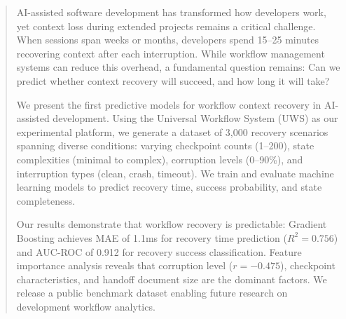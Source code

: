 \begin{abstract}
AI-assisted software development has transformed how developers work, yet context loss during extended projects remains a critical challenge. When sessions span weeks or months, developers spend 15--25 minutes recovering context after each interruption. While workflow management systems can reduce this overhead, a fundamental question remains: Can we predict whether context recovery will succeed, and how long it will take?

We present the first predictive models for workflow context recovery in AI-assisted development. Using the Universal Workflow System (UWS) as our experimental platform, we generate a dataset of 3,000 recovery scenarios spanning diverse conditions: varying checkpoint counts (1--200), state complexities (minimal to complex), corruption levels (0--90\%), and interruption types (clean, crash, timeout). We train and evaluate machine learning models to predict recovery time, success probability, and state completeness.

Our results demonstrate that workflow recovery is predictable: Gradient Boosting achieves MAE of 1.1ms for recovery time prediction ($R^2 = 0.756$) and AUC-ROC of 0.912 for recovery success classification. Feature importance analysis reveals that corruption level ($r = -0.475$), checkpoint characteristics, and handoff document size are the dominant factors. We release a public benchmark dataset enabling future research on development workflow analytics.

\end{abstract}
